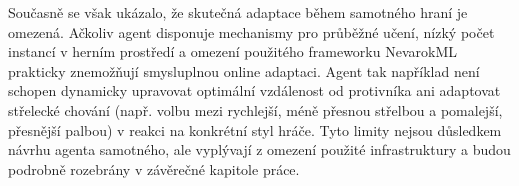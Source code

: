 Současně se však ukázalo, že skutečná adaptace během samotného hraní je omezená. Ačkoliv agent disponuje mechanismy pro průběžné učení, nízký počet instancí v herním prostředí a omezení použitého frameworku NevarokML prakticky znemožňují smysluplnou online adaptaci. Agent tak například není schopen dynamicky upravovat optimální vzdálenost od protivníka ani adaptovat střelecké chování (např. volbu mezi rychlejší, méně přesnou střelbou a pomalejší, přesnější palbou) v reakci na konkrétní styl hráče. Tyto limity nejsou důsledkem návrhu agenta samotného, ale vyplývají z omezení použité infrastruktury a budou podrobně rozebrány v závěrečné kapitole práce.
